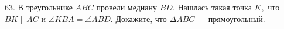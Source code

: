 63. В треугольнике $ABC$ провели медиану $BD.$ Нашлась такая точка $K,$ что $BK\parallel AC$ и $\angle KBA=\angle ABD.$ Докажите, что $\Delta ABC$ --- прямоугольный.\\
